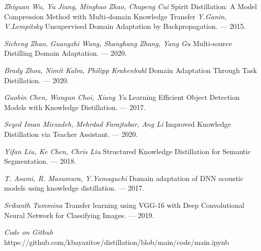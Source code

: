 \begin{thebibliography}{99}
    \textit{Zhiyuan Wu, Yu Jiang,  Minghao Zhao, Chupeng Cui} Spirit Distillation: A Model Compression Method with Multi-domain Knowledge Transfer
    \textit{Y.Ganin, V.Lempitsky} Unsupervised Domain Adaptation by Backpropagation. --- 2015.
    
    \textit{Sicheng Zhao, Guangzhi Wang, Shanghang Zhang, Yang Gu} Multi-source Distilling Domain Adaptation. --- 2020.
    
    \textit{Brady Zhou, Nimit Kalra,  Philipp Krahenbuhl} Domain Adaptation Through Task Distillation. --- 2020.
    
    \textit{Guobin Chen, Wongun Choi, Xiang Yu} Learning Efficient Object Detection Models with Knowledge Distillation. --- 2017.
    
    \textit{Seyed Iman Mirzadeh, Mehrdad Farajtabar, Ang Li} Improved Knowledge Distillation via Teacher Assistant. --- 2020.
    
    \textit{Yifan Liu, Ke Chen, Chris Liu} Structured Knowledge Distillation for Semantic Segmentation. --- 2018.
    
    \textit{T. Asami, R. Masumura, Y.Yamaguchi} Domain adaptation of DNN acoustic models using knowledge distillation. --- 2017.
    
    \textit{Srikanth Tammina} Transfer learning using VGG-16 with Deep
    Convolutional Neural Network for Classifying Images. --- 2019.
    
    \textit{Code on Github}\\ https://github.com/kbayazitov/distillation/blob/main/code/main.ipynb
	
\end{thebibliography}
